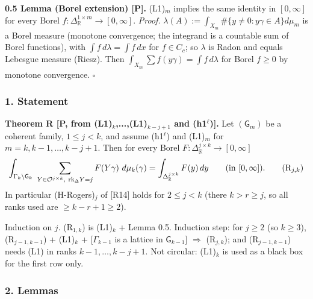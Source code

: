 \textbf{0.5 Lemma (Borel extension) {[}P{]}.} (L1)\(_m\) implies the same identity in \([0,\infty]\) for every Borel \(f:\Delta_{\mathbb R}^{1\times m}\to[0,\infty]\).
\emph{Proof.} \(\lambda(A):=\int_{X_m}\#\{y\ne0:y\gamma\in A\}d\mu_m\) is a Borel measure (monotone convergence; the integrand is a countable sum of Borel functions), with \(\int f\,d\lambda=\int f\,dx\) for \(f\in C_c\); so \(\lambda\) is Radon and equals Lebesgue measure (Riesz). Then \(\int_{X_m}\sum f(y\gamma)=\int f\,d\lambda\) for Borel \(f\ge0\) by monotone convergence. \(\square\)

\hypertarget{statement}{%
\subsubsection*{1. Statement}\label{statement}}

\textbf{Theorem R {[}P, from (L1)\(_k\),...,(L1)\(_{k-j+1}\) and (h1\(^\ell\)){]}.} Let \((\mathsf G_m)\) be a coherent family, \(1\le j<k\), and assume (h1\(^\ell\)) and (L1)\(_m\) for \(m=k,k-1,\dots,k-j+1\). Then for every Borel \(F:\Delta_{\mathbb R}^{j\times k}\to[0,\infty]\)
\[\int_{\Gamma_k\backslash\mathsf G_k}\ \sum_{Y\in\mathcal O^{j\times k},\ \mathrm{rk}_\Delta Y=j}F(Y\gamma)\ d\mu_k(\gamma)=\int_{\Delta_{\mathbb R}^{j\times k}}F(y)\,dy\qquad(\text{in }[0,\infty]).\tag{R$_{j,k}$}\]
In particular (H-Rogers)\(_j\) of {[}R14{]} holds for \(2\le j<k\) (there \(k>r\ge j\), so all ranks used are \(\ge k-r+1\ge2\)).

Induction on \(j\). (R\(_{1,k}\)) is (L1)\(_k\) + Lemma 0.5. Induction step: for \(j\ge2\) (so \(k\ge3\)), (R\(_{j-1,k-1}\)) + (L1)\(_k\) + {[}\(\Gamma_{k-1}\) is a lattice in \(\mathsf G_{k-1}\){]} \(\Rightarrow\) (R\(_{j,k}\)); and (R\(_{j-1,k-1}\)) needs (L1) in ranks \(k-1,\dots,k-j+1\). Not circular: (L1)\(_k\) is used as a black box for the first row only.

\hypertarget{lemmas}{%
\subsubsection*{2. Lemmas}\label{lemmas}}

